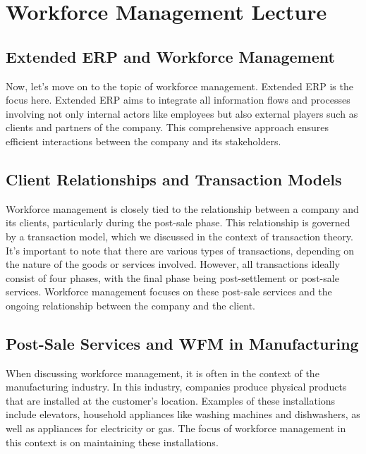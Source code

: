 \section{Workforce Management Lecture}\label{workforce-management-lecture}


\subsection{Extended ERP and Workforce Management}\label{extended-erp-and-workforce-management}

Now, let's move on to the topic of workforce management. Extended ERP is
the focus here. Extended ERP aims to integrate all information flows and
processes involving not only internal actors like employees but also
external players such as clients and partners of the company. This
comprehensive approach ensures efficient interactions between the
company and its stakeholders.


\subsection{Client Relationships and Transaction Models}\label{client-relationships-and-transaction-models}

Workforce management is closely tied to the relationship between a
company and its clients, particularly during the post-sale phase. This
relationship is governed by a transaction model, which we discussed in
the context of transaction theory. It's important to note that there are
various types of transactions, depending on the nature of the goods or
services involved. However, all transactions ideally consist of four
phases, with the final phase being post-settlement or post-sale
services. Workforce management focuses on these post-sale services and
the ongoing relationship between the company and the client.


\subsection{Post-Sale Services and WFM in Manufacturing}\label{post-sale-services-and-wfm-in-manufacturing}

When discussing workforce management, it is often in the context of the
manufacturing industry. In this industry, companies produce physical
products that are installed at the customer's location. Examples of
these installations include elevators, household appliances like washing
machines and dishwashers, as well as appliances for electricity or gas.
The focus of workforce management in this context is on maintaining
these installations.

